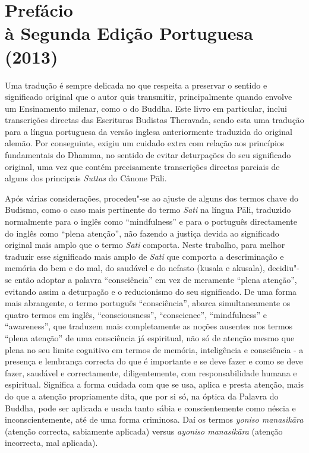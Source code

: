 \chapter[Prefácio à Segunda Edição Portuguesa (2013)]{Prefácio\\ à Segunda Edição Portuguesa\\ (2013)}

Uma tradução é sempre delicada no que respeita a preservar o sentido e
significado original que o autor quis transmitir, principalmente quando envolve
um Ensinamento milenar, como o do Buddha. Este livro em particular, inclui
transcrições directas das Escrituras Budistas Theravada, sendo esta uma tradução
para a língua portuguesa da versão inglesa anteriormente traduzida do original
alemão. Por conseguinte, exigiu um cuidado extra com relação aos princípios
fundamentais do Dhamma, no sentido de evitar deturpações do seu significado
original, uma vez que contém precisamente transcrições directas parciais de
alguns dos principais \emph{Suttas} do Cânone Pāli.

Após várias considerações, procedeu"-se ao ajuste de alguns dos termos chave do
Budismo, como o caso mais pertinente do termo \emph{Sati} na língua Pāli,
traduzido normalmente para o inglês como “mindfulness” e para o português
directamente do inglês como “plena atenção”, não fazendo a justiça devida ao
significado original mais amplo que o termo \emph{Sati} comporta. Neste trabalho,
para melhor traduzir esse significado mais amplo de \emph{Sati} que comporta a 
descriminação e memória do bem e do mal, do saudável e do nefasto (kusala e akusala),
decidiu"-se então adoptar a palavra “consciência” em vez de meramente “plena
atenção”, evitando assim a deturpação e o reducionismo do seu significado. De
uma forma mais abrangente, o termo português “consciência”, abarca
simultaneamente os quatro termos em inglês, “consciousness”, “conscience”,
“mindfulness” e “awareness”, que traduzem mais completamente as noções
ausentes nos termos “plena atenção” de uma consciência já espiritual, não só
de atenção mesmo que plena no seu limite cognitivo em termos de memória,
inteligência e consciência - a presença e lembrança correcta do que é importante
e se deve fazer e como se deve fazer, saudável e correctamente, diligentemente,
com responsabilidade humana e espiritual. Significa a forma cuidada com que se
usa, aplica e presta atenção, mais do que a atenção propriamente dita, que por
si só, na óptica da Palavra do Buddha, pode ser aplicada e usada tanto sábia e 
conscientemente como néscia e inconscientemente, até de uma forma criminosa. 
Daí os termos \emph{yoniso manasikāra} (atenção correcta, sabiamente aplicada) 
versus \emph{ayoniso manasikāra} (atenção incorrecta, mal aplicada).

